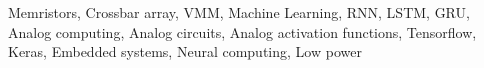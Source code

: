 \begin{keywords}
  Memristors, Crossbar array, VMM, Machine Learning, RNN, LSTM, GRU, Analog computing, Analog circuits, Analog activation functions, Tensorflow, Keras, Embedded systems, Neural computing, Low power
\end{keywords}
\clearpage
\thispagestyle{empty}
\cleardoublepage
